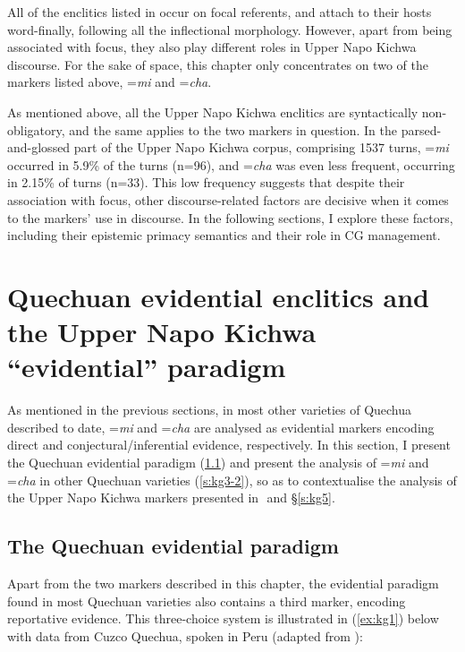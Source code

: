 \documentclass[output=paper]{langscibook}
\begin{document}
All of the enclitics listed in  occur on focal referents, and attach to their hosts word-finally, following all the inflectional morphology. However, apart from being associated with focus, they also play different roles in Upper Napo Kichwa discourse. For the sake of space, this chapter only concentrates on two of the markers listed above, =\textit{mi} and =\textit{cha}.

As mentioned above, all the Upper Napo Kichwa enclitics are syntactically non-obligatory, and the same applies to the two markers in question. In the parsed-and-glossed part of the Upper Napo Kichwa corpus, comprising 1537 turns, =\textit{mi} occurred in 5.9\% of the turns (n=96), and =\textit{cha} was even less frequent, occurring in 2.15\% of turns (n=33). This low frequency suggests that despite their association with focus, other discourse-related factors are decisive when it comes to the markers’ use in discourse. In the following sections, I explore these factors, including their epistemic primacy semantics and their role in CG management.

\section{Quechuan evidential enclitics and the Upper Napo Kichwa “evidential” paradigm}\label{s:kg3}

As mentioned in the previous sections, in most other varieties of Quechua described to date, =\textit{mi} and =\textit{cha} are analysed as evidential markers encoding direct and conjectural/inferential evidence, respectively. In this section, I present the Quechuan evidential paradigm (\ref{s:kg3-1}‎) and present the analysis of =\textit{mi} and =\textit{cha} in other Quechuan varieties (\ref{s:kg3-2}), so as to contextualise the analysis of the Upper Napo Kichwa markers presented in ‎ and §‎\ref{s:kg5}.

\subsection{The Quechuan evidential paradigm}\label{s:kg3-1}

Apart from the two markers described in this chapter, the evidential paradigm found in most Quechuan varieties also contains a third marker, encoding reportative evidence. This three-choice system is illustrated in (\ref{ex:kg1}) below with data from Cuzco Quechua, spoken in Peru (adapted from \citealt[122]{Faller2002}):
\end{document}
